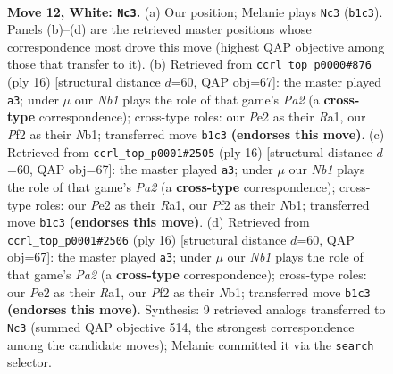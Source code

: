 \documentclass[11pt]{article}
\begin{document}
\clearpage

\begin{figure}[p]\centering
\begin{subfigure}{0.46\textwidth}\centering
\resizebox{\linewidth}{!}{%
\newchessgame
\chessboard[
  setfen={rn1qk2r/p3bpp1/b4n2/2pp3p/8/1P4PN/P2BPPBP/RN1QK2R w KQkq - 0 12},
  showmover=false,
  pgfstyle=straightmove, color=movearrow, markmove={b1-c3}
]}
\caption{}
\end{subfigure}\hfill
\begin{subfigure}{0.46\textwidth}\centering
\resizebox{\linewidth}{!}{%
\newchessgame
\chessboard[
  setfen={r1bqk2r/pp3ppp/2n2n2/2bp4/8/5NP1/PPP2PBP/RNBQ1RK1 w kq - 0 9},
  showmover=false,
  pgfstyle=straightmove, color=movearrow, markmove={a2-a3}
]}
\caption{}
\end{subfigure}
\\[4pt]
\begin{subfigure}{0.46\textwidth}\centering
\resizebox{\linewidth}{!}{%
\newchessgame
\chessboard[
  setfen={r1bqk2r/pp3ppp/2n2n2/2bp4/8/5NP1/PPP2PBP/RNBQ1RK1 w kq - 0 9},
  showmover=false,
  pgfstyle=straightmove, color=movearrow, markmove={a2-a3}
]}
\caption{}
\end{subfigure}\hfill
\begin{subfigure}{0.46\textwidth}\centering
\resizebox{\linewidth}{!}{%
\newchessgame
\chessboard[
  setfen={r1bqk2r/pp3ppp/2n2n2/2bp4/8/5NP1/PPP2PBP/RNBQ1RK1 w kq - 0 9},
  showmover=false,
  pgfstyle=straightmove, color=movearrow, markmove={a2-a3}
]}
\caption{}
\end{subfigure}
\caption{\textbf{Move 12, White: \texttt{Nc3}.} (a) Our position; Melanie plays \texttt{Nc3} (\texttt{b1c3}). Panels (b)--(d) are the retrieved master positions whose correspondence most drove this move (highest QAP objective among those that transfer to it). (b) Retrieved from \texttt{ccrl\_top\_p0000\#876} (ply 16) [structural distance $d$=60, QAP obj=67]: the master played \texttt{a3}; under $\mu$ our \emph{Nb1} plays the role of that game's \emph{Pa2} (a \textbf{cross-type} correspondence); cross-type roles: our \emph{P}e2 as their \emph{R}a1, our \emph{P}f2 as their \emph{N}b1; transferred move \texttt{b1c3} \textbf{(endorses this move)}. (c) Retrieved from \texttt{ccrl\_top\_p0001\#2505} (ply 16) [structural distance $d$=60, QAP obj=67]: the master played \texttt{a3}; under $\mu$ our \emph{Nb1} plays the role of that game's \emph{Pa2} (a \textbf{cross-type} correspondence); cross-type roles: our \emph{P}e2 as their \emph{R}a1, our \emph{P}f2 as their \emph{N}b1; transferred move \texttt{b1c3} \textbf{(endorses this move)}. (d) Retrieved from \texttt{ccrl\_top\_p0001\#2506} (ply 16) [structural distance $d$=60, QAP obj=67]: the master played \texttt{a3}; under $\mu$ our \emph{Nb1} plays the role of that game's \emph{Pa2} (a \textbf{cross-type} correspondence); cross-type roles: our \emph{P}e2 as their \emph{R}a1, our \emph{P}f2 as their \emph{N}b1; transferred move \texttt{b1c3} \textbf{(endorses this move)}. Synthesis: 9 retrieved analogs transferred to \texttt{Nc3} (summed QAP objective 514, the strongest correspondence among the candidate moves); Melanie committed it via the \texttt{search} selector.}
\label{fig:thought-m22}
\end{figure}
\end{document}

